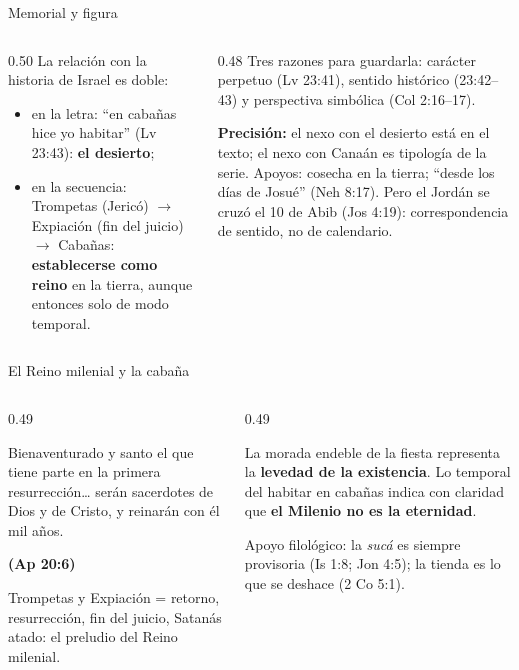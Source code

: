 \documentclass[hyperref={bookmarks=false},aspectratio=169]{beamer}
\newcommand{\fuente}[1]{\par\hfill{\upshape\bfseries\footnotesize\textcolor{tierraroja}{#1}}}
\newcommand{\destacar}[1]{\textbf{\textcolor{tierraroja}{#1}}}
\newcommand{\precision}[1]{{\footnotesize\color{sepia}\textbf{Precisión:} #1}}
\begin{document}
\begin{frame}{Memorial y figura}
\begin{columns}[t,onlytextwidth]
\begin{column}{0.50\textwidth}\small
La relación con la historia de Israel es doble:
\begin{itemize}
\item en la letra: ``en cabañas hice yo habitar'' (Lv 23:43): \destacar{el desierto};
\item en la secuencia: Trompetas (Jericó) $\rightarrow$ Expiación (fin del juicio) $\rightarrow$ Cabañas: \destacar{establecerse como reino} en la tierra, aunque entonces solo de modo temporal.
\end{itemize}
\end{column}
\begin{column}{0.48\textwidth}\scriptsize
Tres razones para guardarla: carácter perpetuo (Lv 23:41), sentido histórico (23:42--43) y perspectiva simbólica (Col 2:16--17).\par\medskip
\precision{el nexo con el desierto está en el texto; el nexo con Canaán es tipología de la serie. Apoyos: cosecha en la tierra; ``desde los días de Josué'' (Neh 8:17). Pero el Jordán se cruzó el 10 de Abib (Jos 4:19): correspondencia de sentido, no de calendario.}
\end{column}
\end{columns}
\end{frame}

\begin{frame}{El Reino milenial y la cabaña}
\begin{columns}[t,onlytextwidth]
\begin{column}{0.49\textwidth}
\begin{cita}Bienaventurado y santo el que tiene parte en la primera resurrección\ldots{} serán sacerdotes de Dios y de Cristo, y reinarán con él mil años.\fuente{(Ap 20:6)}\end{cita}
\scriptsize Trompetas y Expiación = retorno, resurrección, fin del juicio, Satanás atado: el preludio del Reino milenial.
\end{column}
\begin{column}{0.49\textwidth}
\begin{tcolorbox}[colback=papiro,colframe=tierraroja,boxrule=1pt,arc=3pt,left=4pt,right=4pt]
\scriptsize La morada endeble de la fiesta representa la \destacar{levedad de la existencia}. Lo temporal del habitar en cabañas indica con claridad que \destacar{el Milenio no es la eternidad}.
\end{tcolorbox}
\scriptsize Apoyo filológico: la \emph{sucá} es siempre provisoria (Is 1:8; Jon 4:5); la tienda es lo que se deshace (2 Co 5:1).
\end{column}
\end{columns}
\end{frame}
\end{document}
